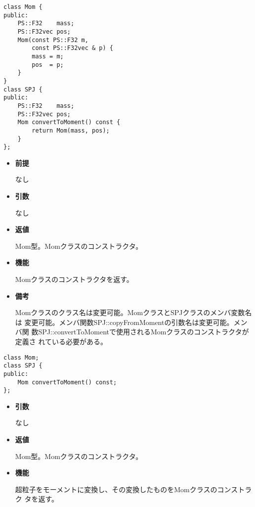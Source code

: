 
\begin{screen}
\begin{verbatim}
class Mom {
public:
    PS::F32    mass;
    PS::F32vec pos;
    Mom(const PS::F32 m,
        const PS::F32vec & p) {
        mass = m;
        pos  = p;
    }
}
class SPJ {
public:
    PS::F32    mass;
    PS::F32vec pos;
    Mom convertToMoment() const {
        return Mom(mass, pos);
    }
};
\end{verbatim}
\end{screen}

\begin{itemize}

\item {\bf 前提}

  なし
  
\item {\bf 引数}

  なし

\item {\bf 返値}

  Mom型。Momクラスのコンストラクタ。
  
\item {\bf 機能}

  Momクラスのコンストラクタを返す。

\item {\bf 備考}

  Momクラスのクラス名は変更可能。MomクラスとSPJクラスのメンバ変数名は
  変更可能。メンバ関数SPJ::copyFromMomentの引数名は変更可能。メンバ関
  数SPJ::convertToMomentで使用されるMomクラスのコンストラクタが定義さ
  れている必要がある。

\end{itemize}
\fi

\begin{screen}
\begin{verbatim}
class Mom;
class SPJ {
public:
    Mom convertToMoment() const;
};
\end{verbatim}
\end{screen}

\begin{itemize}

\item {\bf 引数}

  なし

\item {\bf 返値}

  Mom型。Momクラスのコンストラクタ。
  
\item {\bf 機能}
  
  超粒子をモーメントに変換し、その変換したものをMomクラスのコンストラク
  タを返す。

\end{itemize}

